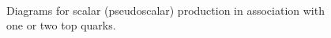 \begin{figure}[htbp!]
    \centering
     \\
\caption{Diagrams for scalar (pseudoscalar) production in association with 
one or two top quarks.}
\label{fig:thdm_diagrams}
\end{figure}

